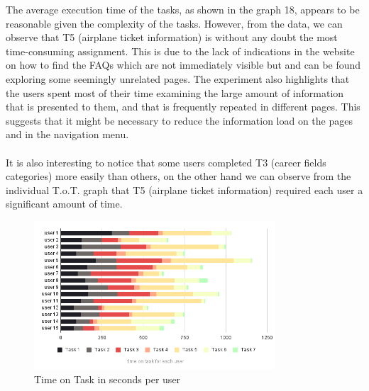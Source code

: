 \documentclass[11pt]{article} %
\begin{document}
The average execution time of the tasks, as shown in the graph 18, appears to be reasonable given the complexity of the tasks. However, from the data, we can observe that T5 (airplane ticket information) is without any doubt the most time-consuming assignment. This is due to the lack of indications in the website on how to find the FAQs which are not immediately visible but and can be found exploring some seemingly unrelated pages.
The experiment also highlights that the users spent most of their time examining the large amount of information that is presented to them, and that is frequently repeated in different pages. This suggests that it might be necessary to reduce the information load on the pages and in the navigation menu.
\\\\
It is also interesting to notice that some users completed T3 (career fields categories) more easily than others, on the other hand we can observe from the individual T.o.T. graph that T5 (airplane ticket information) required each user a significant amount of time.
\begin{figure}[ht]
  \centering
    \includegraphics[width=0.8\textwidth]{Images/totUsers.png}
    \caption{Time on Task in seconds per user}
\end{figure}

\end{document}
